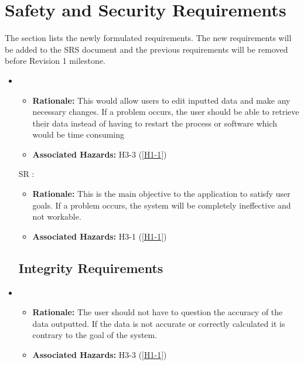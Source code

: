 \documentclass{article}
\newcounter{Sreqnum} %
\begin{document}
\section{Safety and Security Requirements}
The section lists the newly formulated requirements. The new requirements will be added to the SRS document and the previous requirements will be removed before Revision 1 milestone.

\begin{itemize} %
\subsection{Access Requirements}

\item[SR\refstepcounter{Sreqnum}\theSreqnum
\label{ACR1}:] 
\begin{itemize}
    \item \textbf{Rationale:} This would allow users to edit inputted data and make any necessary changes. If a problem occurs, the user should be able to retrieve their data instead of having to restart the process or software which would be time consuming
    \item \textbf{Associated Hazards: } H3-3 (\ref{H1-1})
\end{itemize}

\item[SR\refstepcounter{Sreqnum}\theSreqnum
\label{ACR2}:] 
\begin{itemize}
    \item \textbf{Rationale:} This is the main objective to the application to satisfy user goals. If a problem occurs, the system will be completely ineffective and not workable. 
    \item \textbf{Associated Hazards:} H3-1 (\ref{H1-1})
\end{itemize}

\subsection{Integrity Requirements}
\item[SR\refstepcounter{Sreqnum}\theSreqnum
\label{IR1}:] 
\begin{itemize}
    \item \textbf{Rationale:} The user should not have to question the accuracy of the data outputted. If the data is not accurate or correctly calculated it is contrary to the goal of the system. 
    \item \textbf{Associated Hazards:} H3-3 (\ref{H1-1})
\end{itemize}


\end{itemize}
\end{document}
